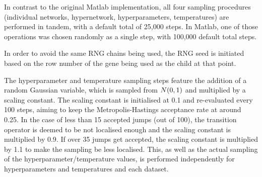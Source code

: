 \documentclass{article}
\let\originalleft\left
\let\originalright\right
\renewcommand{\left}{\mathopen{}\mathclose\bgroup\originalleft}
\renewcommand{\right}{\aftergroup\egroup\originalright}
\begin{document}
In contrast to the original Matlab implementation, all four sampling procedures (individual networks, hypernetwork, hyperparameters, temperatures) are performed in tandem, with a default total of 25,000 steps. In Matlab, one of those operations was chosen randomly as a single step, with 100,000 default total steps.

In order to avoid the same RNG chains being used, the RNG seed is initiated based on the row number of the gene being used as the child at that point.

The hyperparameter and temperature sampling steps feature the addition of a random Gaussian variable, which is sampled from $N\left(0,1\right)$ and multiplied by a scaling constant. The scaling constant is initialised at 0.1 and re-evaluated every 100 steps, aiming to keep the Metropolis-Hastings acceptance rate at around 0.25. In the case of less than 15 accepted jumps (out of 100), the transition operator is deemed to be not localised enough and the scaling constant is multiplied by 0.9. If over 35 jumps get accepted, the scaling constant is multiplied by 1.1 to make the sampling be less localised. This, as well as the actual sampling of the hyperparameter/temperature values, is performed independently for hyperparameters and temperatures and each dataset.





\end{document}
